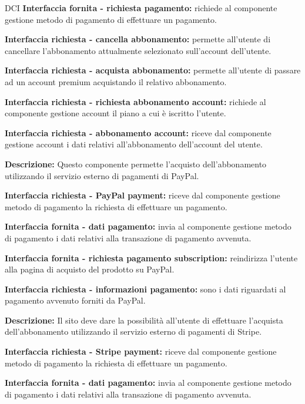 \begin{listaPersonale}{DCI}
    \textbf{Interfaccia fornita - richiesta pagamento:} richiede al componente gestione metodo di pagamento di effettuare un pagamento.

    \textbf{Interfaccia richiesta - cancella abbonamento:} permette all'utente di cancellare l'abbonamento attualmente selezionato sull'account dell'utente.

    \textbf{Interfaccia richiesta - acquista abbonamento:} permette all'utente di passare ad un account premium acquistando il relativo abbonamento.

    \textbf{Interfaccia richiesta - richiesta abbonamento account:} richiede al componente gestione account il piano a cui è iscritto l'utente.

    \textbf{Interfaccia richiesta - abbonamento account:} riceve dal componente gestione account i dati relativi all'abbonamento dell'account del utente.



    \textbf{Descrizione:} Questo componente permette l'acquisto dell'abbonamento utilizzando il servizio esterno di pagamenti di PayPal.

    \textbf{Interfaccia richiesta - PayPal payment:} riceve dal componente gestione metodo di pagamento la richiesta di effettuare un pagamento.

    \textbf{Interfaccia fornita - dati pagamento:} invia al componente gestione metodo di pagamento i dati relativi alla transazione di pagamento avvenuta.

    \textbf{Interfaccia fornita - richiesta pagamento subscription:} reindirizza l'utente alla pagina di acquisto del prodotto su PayPal.

    \textbf{Interfaccia richiesta - informazioni pagamento:} sono i dati riguardati al pagamento avvenuto forniti da PayPal.



    \textbf{Descrizione:} Il sito deve dare la possibilità all'utente di effettuare l'acquista dell'abbonamento utilizzando il servizio esterno di pagamenti di Stripe.

    \textbf{Interfaccia richiesta - Stripe payment:} riceve dal componente gestione metodo di pagamento la richiesta di effettuare un pagamento.

    \textbf{Interfaccia fornita - dati pagamento:} invia al componente gestione metodo di pagamento i dati relativi alla transazione di pagamento avvenuta.


\end{listaPersonale}
